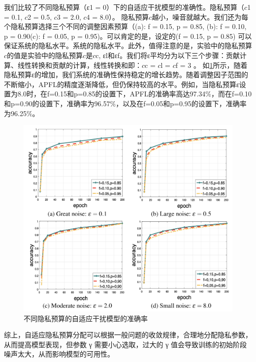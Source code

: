 我们比较了不同隐私预算（ε1 = 0）下的自适应干扰模型的准确性。隐私预算（$c$1 = 0.1, $c$2 = 0.5, $c$3 = 2.0, $c$4 = 8.0）。
隐私预算$c$越小，噪音就越大。我们还为每个隐私预算选择三个不同的调整因素预算（(a): f = 0.15, p = 0.85, (b): f = 0.10, p = 0.90(c): f = 0.05, p = 0.95)。可以肯定的是，设定的(f = 0.15, p = 0.85) 可以保证系统的隐私水平。系统的隐私水平。此外，值得注意的是，实验中的隐私预算$c$的值是实验中的隐私预算$c$是$c$c, εl和εf。我们将ε平均分为以下三个步骤：贡献计算、线性转换和贡献的计算，线性转换和即：$c$c = $c$l = $c$f = 3 。
如\ref{fig:不同隐私预算的自适应干扰机制在MINIST数据集上的准确率}所示，随着隐私预算ε的增加，我们系统的准确性保持稳定的增长趋势。随着调整因子范围的不断缩小，APFL的精度逐渐降低，但仍保持较高的水平。例如，当隐私预算ε设置为8.0时，在f=0.15和p=0.85的设置下，APFL的准确率高达97.34$\%$，而在f=0.10和p=0.90的设置下，准确率为96.57$\%$，以及在f=0.05和p=0.95的设置下，准确率为96.25$\%$。

\begin{figure}[!hbt]
\centering
  	\includegraphics[scale=0.6]{fig2/C5/自适应干扰实验}%
	\caption{不同隐私预算的自适应干扰模型的准确率}
  	\label{fig:不同隐私预算的自适应干扰机制在MINIST数据集上的准确率} 
\end{figure}

综上，自适应隐私预算分配可以根据一般问题的收敛规律，合理地分配隐私参数，从而提高模型表现，但参数 γ 需要小心选取，过大的 γ 值会导致训练的初始阶段噪声太大，从而影响模型的可用性。

